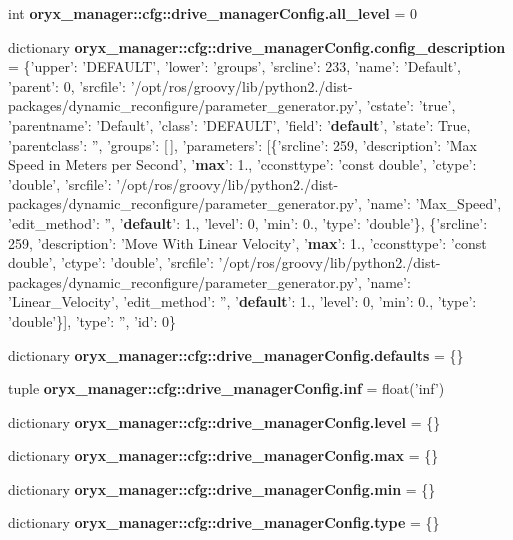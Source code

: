 \begin{DoxyCompactItemize}
\item 
int {\bf oryx\-\_\-manager\-::cfg\-::drive\-\_\-manager\-Config.\-all\-\_\-level} = 0
\item 
dictionary {\bf oryx\-\_\-manager\-::cfg\-::drive\-\_\-manager\-Config.\-config\-\_\-description} = \{'upper'\-: '\-D\-E\-F\-A\-U\-L\-T', 'lower'\-: 'groups', 'srcline'\-: 233, 'name'\-: '\-Default', 'parent'\-: 0, 'srcfile'\-: '/opt/ros/groovy/lib/python2./dist-\/packages/dynamic\-\_\-reconfigure/parameter\-\_\-generator.\-py', 'cstate'\-: 'true', 'parentname'\-: '\-Default', 'class'\-: '\-D\-E\-F\-A\-U\-L\-T', 'field'\-: '{\bf default}', 'state'\-: \-True, 'parentclass'\-: '', 'groups'\-: [$\,$], 'parameters'\-: [\{'srcline'\-: 259, 'description'\-: '\-Max \-Speed in \-Meters per \-Second', '{\bf max}'\-: 1., 'cconsttype'\-: 'const double', 'ctype'\-: 'double', 'srcfile'\-: '/opt/ros/groovy/lib/python2./dist-\/packages/dynamic\-\_\-reconfigure/parameter\-\_\-generator.\-py', 'name'\-: '\-Max\-\_\-\-Speed', 'edit\-\_\-method'\-: '', '{\bf default}'\-: 1., 'level'\-: 0, 'min'\-: 0., 'type'\-: 'double'\}, \{'srcline'\-: 259, 'description'\-: '\-Move \-With \-Linear \-Velocity', '{\bf max}'\-: 1., 'cconsttype'\-: 'const double', 'ctype'\-: 'double', 'srcfile'\-: '/opt/ros/groovy/lib/python2./dist-\/packages/dynamic\-\_\-reconfigure/parameter\-\_\-generator.\-py', 'name'\-: '\-Linear\-\_\-\-Velocity', 'edit\-\_\-method'\-: '', '{\bf default}'\-: 1., 'level'\-: 0, 'min'\-: 0., 'type'\-: 'double'\}], 'type'\-: '', 'id'\-: 0\}
\item 
dictionary {\bf oryx\-\_\-manager\-::cfg\-::drive\-\_\-manager\-Config.\-defaults} = \{\}
\item 
tuple {\bf oryx\-\_\-manager\-::cfg\-::drive\-\_\-manager\-Config.\-inf} = float('inf')
\item 
dictionary {\bf oryx\-\_\-manager\-::cfg\-::drive\-\_\-manager\-Config.\-level} = \{\}
\item 
dictionary {\bf oryx\-\_\-manager\-::cfg\-::drive\-\_\-manager\-Config.\-max} = \{\}
\item 
dictionary {\bf oryx\-\_\-manager\-::cfg\-::drive\-\_\-manager\-Config.\-min} = \{\}
\item 
dictionary {\bf oryx\-\_\-manager\-::cfg\-::drive\-\_\-manager\-Config.\-type} = \{\}
\end{DoxyCompactItemize}
